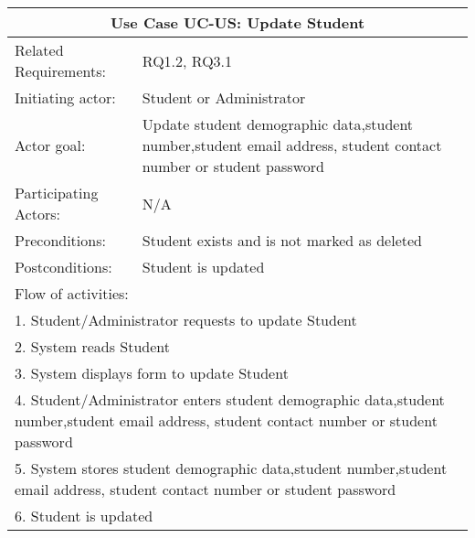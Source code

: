 \documentclass[12pt]{article}
\begin{document}
{		\begin{tabular}{| l | p{10cm}| }
			\hline\multicolumn{2}{|c|}{ \textbf{Use Case UC-US: Update Student}} \\ \hline
			Related Requirements: & RQ1.2, RQ3.1 \\ \hline
			Initiating actor: & Student or Administrator \\ \hline
			Actor goal: & Update student demographic data,student number,student email address, student contact number or student password\\ \hline
			Participating Actors: & N/A\\ \hline
			Preconditions: & Student exists and is not marked as deleted\\ \hline
			Postconditions: & Student is updated\\ \hline
			\multicolumn{2}{|l|}{Flow of activities:}\\ \hline
			\multicolumn{2}{|p{15cm}|}{1. Student/Administrator requests to update Student}\\
			\multicolumn{2}{|p{15cm}|}{2. System reads Student}\\
			\multicolumn{2}{|p{15cm}|}{3. System displays form to update Student}\\
			\multicolumn{2}{|p{15cm}|}{4. Student/Administrator enters student demographic data,student number,student email address, student contact number or student password}	\\		
			\multicolumn{2}{|p{15cm}|}{5. System stores student demographic data,student number,student email address, student contact number or student password}\\
			\multicolumn{2}{|l|}{6. Student is updated}	
			\\ \hline		
		\end{tabular}
		
		
		
		
		\begin{tabular}{| l | l| }
		

\end{tabular}}
\end{document}
